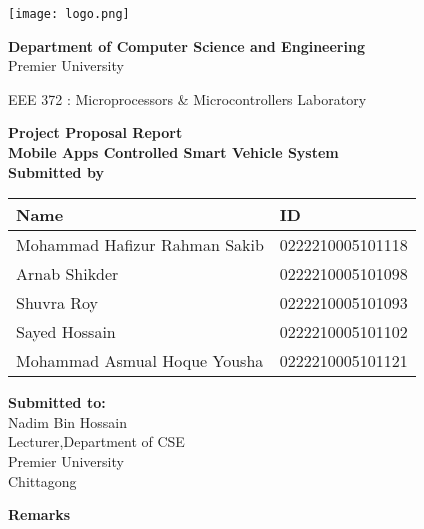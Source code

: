 \documentclass[12pt,a4paper]{article}
\begin{document}
\begin{titlepage}
    \centering
    \begin{center}
        \texttt{[image: logo.png]} %
    \end{center}
\begin{center}
    \textbf{Department of Computer Science and Engineering}\\
    Premier University
\end{center}
\begin{center}
    \textnormal{EEE 372 : Microprocessors \& Microcontrollers Laboratory}
\end{center}
    \huge
    \textbf{Project Proposal Report}\\
    \vspace{0.5in}
    \LARGE
    \textbf{Mobile Apps Controlled Smart Vehicle System}\\
    \vspace{1in}
    \large
    \textbf {Submitted by}\\
    \begin{center}
        \renewcommand{\arraystretch}{1.5} %
        \begin{tabular}{|>{\raggedright\arraybackslash}p{}|p{}|} %
        \hline
        \textbf{Name} & \textbf{ID} \\
        \hline
        Mohammad Hafizur Rahman Sakib & 0222210005101118 \\
        \hline
        Arnab Shikder & 0222210005101098 \\
        \hline
        Shuvra Roy & 0222210005101093 \\
        \hline
        Sayed Hossain & 0222210005101102 \\
        \hline
        Mohammad Asmual Hoque Yousha & 0222210005101121 \\
        \hline
        \end{tabular}
        \end{center}
    \vspace{0.5in}
 
    \begin{minipage}[t]{0.5\textwidth}
        \textbf{Submitted to:}
        \\Nadim Bin Hossain
        \\Lecturer,Department of CSE
        \\ Premier University
        \\ Chittagong
    \end{minipage}%
    \begin{minipage}[t]{0.6\textwidth}
        \raggedleft
        \textbf{Remarks}\\
        \vspace{0.5cm} %
    \end{minipage}

    \date{\today}
    \vfill
\end{titlepage}
\end{document}
